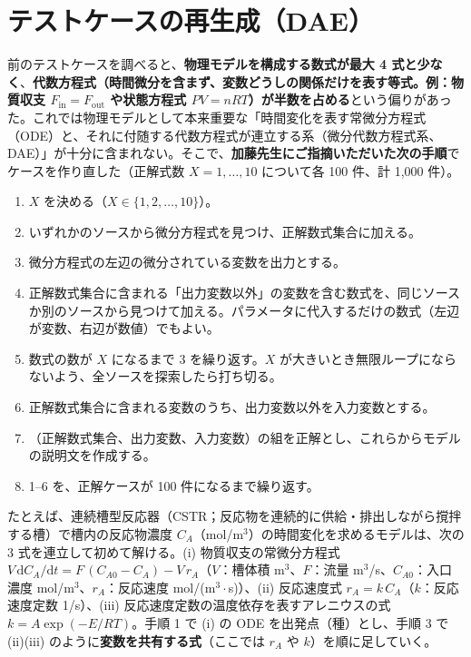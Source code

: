 \documentclass[a4j,dvipdfmx,12pt]{jresume}
\begin{document}
\section{テストケースの再生成（DAE）}\label{sec:dae}
前のテストケースを調べると、\textbf{物理モデルを構成する数式が最大 4 式と少なく}、\textbf{代数方程式（時間微分を含まず、変数どうしの関係だけを表す等式。例：物質収支 $F_{\mathrm{in}}=F_{\mathrm{out}}$ や状態方程式 $PV=nRT$）が半数を占める}という偏りがあった。これでは物理モデルとして本来重要な「時間変化を表す常微分方程式（ODE）と、それに付随する代数方程式が連立する系（微分代数方程式系、DAE）」が十分に含まれない。そこで、\textbf{加藤先生にご指摘いただいた次の手順}でケースを作り直した（正解式数 $X=1,\dots,10$ について各 100 件、計 1{,}000 件）。

\begin{algobox}
\small
\begin{enumerate}[leftmargin=1.6em, nosep]
  \item[0.] $X$ を決める（$X\in\{1,2,\dots,10\}$）。
  \item いずれかのソースから微分方程式を見つけ、正解数式集合に加える。
  \item 微分方程式の左辺の微分されている変数を出力とする。
  \item 正解数式集合に含まれる「出力変数以外」の変数を含む数式を、同じソースか別のソースから見つけて加える。パラメータに代入するだけの数式（左辺が変数、右辺が数値）でもよい。
  \item 数式の数が $X$ になるまで 3 を繰り返す。$X$ が大きいとき無限ループにならないよう、全ソースを探索したら打ち切る。
  \item 正解数式集合に含まれる変数のうち、出力変数以外を入力変数とする。
  \item （正解数式集合、出力変数、入力変数）の組を正解とし、これらからモデルの説明文を作成する。
  \item 1--6 を、正解ケースが 100 件になるまで繰り返す。
\end{enumerate}
\end{algobox}

たとえば、連続槽型反応器（CSTR；反応物を連続的に供給・排出しながら撹拌する槽）で槽内の反応物濃度 $C_A$（mol/m$^3$）の時間変化を求めるモデルは、次の 3 式を連立して初めて解ける。(i) 物質収支の常微分方程式 $V\,\mathrm{d}C_A/\mathrm{d}t = F\,(C_{A0}-C_A) - V\,r_A$（$V$：槽体積 m$^3$、$F$：流量 m$^3$/s、$C_{A0}$：入口濃度 mol/m$^3$、$r_A$：反応速度 mol/(m$^3\cdot$s)）、(ii) 反応速度式 $r_A = k\,C_A$（$k$：反応速度定数 1/s）、(iii) 反応速度定数の温度依存を表すアレニウスの式 $k = A\exp(-E/RT)$。手順 1 で (i) の ODE を出発点（種）とし、手順 3 で (ii)(iii) のように\textbf{変数を共有する式}（ここでは $r_A$ や $k$）を順に足していく。
\end{document}
